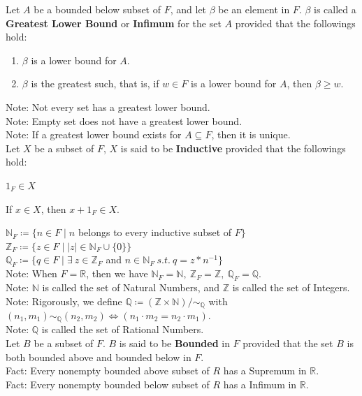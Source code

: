 \documentclass[11pt]{article}
\newcommand{\R}{\mathbb{R}}
\newcommand{\N}{\mathbb{N}}
\newcommand{\Z}{\mathbb{Z}}
\newcommand{\Q}{\mathbb{Q}}
\newcommand{\note}{\color{gray}Note: \color{black}}
\newcommand{\fact}{\color{gray}Fact: \color{black}}
\begin{document}
		\noindent Let $A$ be a bounded below subset of $F$, and let $\beta$ be an element in $F$. $\beta$ is called a \textbf{Greatest Lower Bound} or \textbf{Infimum} for the set $A$ provided that the followings hold:
		\begin{enumerate}[topsep=3pt,itemsep=-1ex,partopsep=1ex,parsep=1ex]
			\item $\beta$ is a lower bound for $A$.
			\item $\beta$ is the greatest such, that is, if $w \in F$ is a lower bound for $A$, then $\beta \geq w$.
		\end{enumerate}
		\note Not every set has a greatest lower bound.\\
		\note Empty set does not have a greatest lower bound.\\
		\note If a greatest lower bound exists for $A \subseteq F$, then it is unique.\\
		
		\noindent Let $X$ be a subset of $F$, $X$ is said to be \textbf{Inductive} provided that the followings hold:\\
		\begin{inparaitem}
			\item $1_F \in X \ \ \ \ \ \ \ \ \ \ \ \ \ \ \ \ \ \ \ $
			\item If $x \in X$, then $x+1_F \in X$.
		\end{inparaitem}
	
		\hfill\break
		\noindent ${\N}_F \coloneqq \{ n \in F \mid n$ belongs to every inductive subset of $F \}$\\
		\noindent ${\Z}_F \coloneqq \{ z \in F \mid |z| \in {\N}_F \cup \{0\}\}$\\
		\noindent ${\Q}_F \coloneqq \{ q \in F \mid \exists \ z \in {\Z}_F$ and $n \in {\N}_F \ s.t. \  q=z \ast n^{-1} \} $\\
		\note When $F = \R$, then we have ${\N}_F=\N , \ {\Z}_F=\Z , \ {\Q}_F=\Q $.\\
		\note $\N$ is called the set of Natural Numbers, and $\Z$ is called the set of Integers.\\
		\note Rigorously, we define $\Q \coloneqq (\Z \times \N)/{\sim_{\Q}}$ with $(n_1,m_1)\sim_\Q (n_2,m_2) \iff (n_1 \cdot m_2 = n_2 \cdot m_1)$.\\
		\note $\Q$ is called the set of Rational Numbers.\\
	
		\noindent Let $B$ be a subset of $F$. $B$ is said to be  \textbf{Bounded} in $F$ provided that the set $B$ is both bounded above and bounded below in $F$.\\
		\fact Every nonempty bounded above subset of $R$ has a Supremum in $\R$.\\
		\fact Every nonempty bounded below subset of $R$ has a Infimum in $\R$.\\
		
\end{document}
